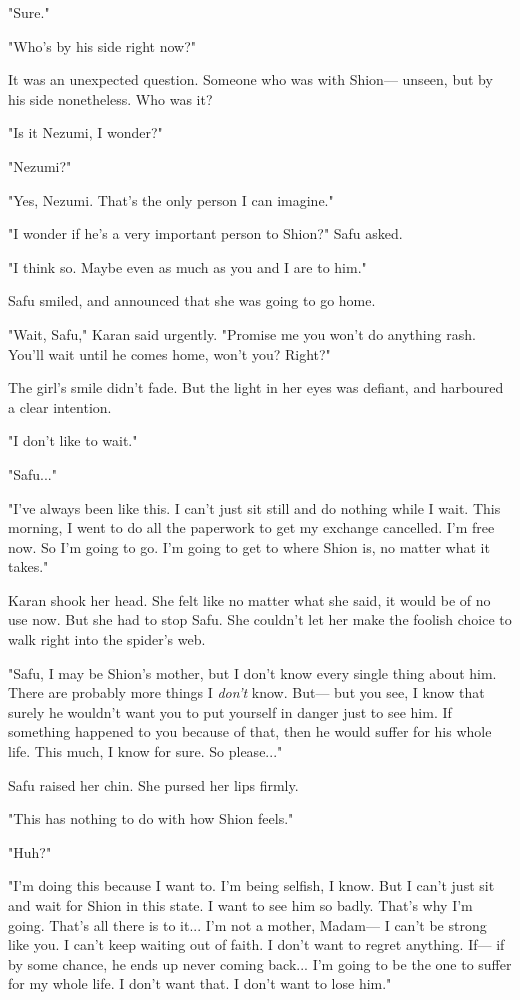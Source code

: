 "Sure."

"Who's by his side right now?"

It was an unexpected question. Someone who was with Shion--- unseen, but
by his side nonetheless. Who was it?

"Is it Nezumi, I wonder?"

"Nezumi?"

"Yes, Nezumi. That's the only person I can imagine."

"I wonder if he's a very important person to Shion?" Safu asked.

"I think so. Maybe even as much as you and I are to him."

Safu smiled, and announced that she was going to go home.

"Wait, Safu," Karan said urgently. "Promise me you won't do anything
rash. You'll wait until he comes home, won't you? Right?"

The girl's smile didn't fade. But the light in her eyes was defiant, and
harboured a clear intention.

"I don't like to wait."

"Safu..."

"I've always been like this. I can't just sit still and do nothing while
I wait. This morning, I went to do all the paperwork to get my exchange
cancelled. I'm free now. So I'm going to go. I'm going to get to where
Shion is, no matter what it takes."

Karan shook her head. She felt like no matter what she said, it would be
of no use now. But she had to stop Safu. She couldn't let her make the
foolish choice to walk right into the spider's web.

"Safu, I may be Shion's mother, but I don't know every single thing
about him. There are probably more things I \emph{don't} know. But--- but you
see, I know that surely he wouldn't want you to put yourself in danger
just to see him. If something happened to you because of that, then he
would suffer for his whole life. This much, I know for sure. So
please..."

Safu raised her chin. She pursed her lips firmly.

"This has nothing to do with how Shion feels."

"Huh?"

"I'm doing this because I want to. I'm being selfish, I know. But I
can't just sit and wait for Shion in this state. I want to see him so
badly. That's why I'm going. That's all there is to it... I'm not a
mother, Madam--- I can't be strong like you. I can't keep waiting out of
faith. I don't want to regret anything. If--- if by some chance, he ends
up never coming back... I'm going to be the one to suffer for my whole
life. I don't want that. I don't want to lose him."

